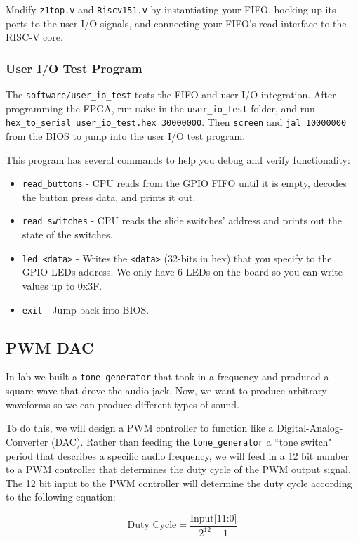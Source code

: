 \documentclass[11pt]{article}
\begin{document}
Modify \verb|z1top.v| and \verb|Riscv151.v| by instantiating your FIFO, hooking up its ports to the user I/O signals, and connecting your FIFO's read interface to the RISC-V core.

\subsubsection{User I/O Test Program}
The \verb|software/user_io_test| tests the FIFO and user I/O integration.
After programming the FPGA, run \verb|make| in the \verb|user_io_test| folder, and run \verb|hex_to_serial user_io_test.hex 30000000|.
Then \verb|screen| and \verb|jal 10000000| from the BIOS to jump into the user I/O test program.

This program has several commands to help you debug and verify functionality:
\begin{itemize}
  \item \verb|read_buttons| - CPU reads from the GPIO FIFO until it is empty, decodes the button press data, and prints it out.
  \item \verb|read_switches| - CPU reads the slide switches' address and prints out the state of the switches.
  \item \verb|led <data>| - Writes the \verb|<data>| (32-bits in hex) that you specify to the GPIO LEDs address. We only have 6 LEDs on the board so you can write values up to 0x3F.
  \item \verb|exit| - Jump back into BIOS.
\end{itemize}

\subsection{PWM DAC}
In lab we built a \verb|tone_generator| that took in a frequency and produced a square wave that drove the audio jack.
Now, we want to produce arbitrary waveforms so we can produce different types of sound.

To do this, we will design a PWM controller to function like a Digital-Analog-Converter (DAC).
Rather than feeding the \verb|tone_generator| a ``tone switch" period that describes a specific audio frequency, we will feed in a 12 bit number to a PWM controller that determines the duty cycle of the PWM output signal.
The 12 bit input to the PWM controller will determine the duty cycle according to the following equation:

\begin{equation*}
  \text{Duty Cycle} = \frac{\text{Input[11:0]}}{2^{12} - 1}
\end{equation*}
\end{document}
